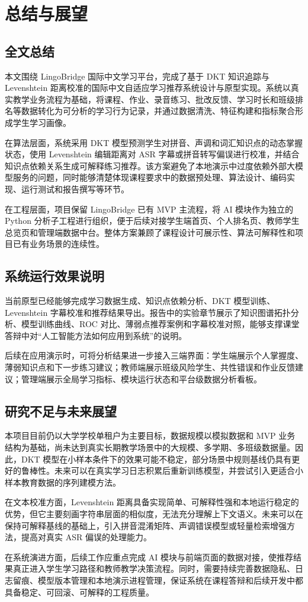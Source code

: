 
\chapter{总结与展望}

\section{全文总结}

本文围绕 LingoBridge 国际中文学习平台，完成了基于 DKT 知识追踪与 Levenshtein 距离校准的国际中文自适应学习推荐系统设计与原型实现。系统以真实教学业务流程为基础，将课程、作业、录音练习、批改反馈、学习时长和班级排名等数据转化为可分析的学习行为记录，并通过数据清洗、特征构建和指标聚合形成学生学习画像。

在算法层面，系统采用 DKT 模型预测学生对拼音、声调和词汇知识点的动态掌握状态，使用 Levenshtein 编辑距离对 ASR 字幕或拼音转写偏误进行校准，并结合知识点依赖关系生成可解释练习推荐。该方案避免了本地演示中过度依赖外部大模型服务的问题，同时能够清楚体现课程要求中的数据预处理、算法设计、编码实现、运行测试和报告撰写等环节。

在工程层面，项目保留 LingoBridge 已有 MVP 主流程，将 AI 模块作为独立的 Python 分析子工程进行组织，便于后续对接学生端首页、个人排名页、教师学生总览页和管理端数据中台。整体方案兼顾了课程设计可展示性、算法可解释性和项目已有业务场景的连续性。

\section{系统运行效果说明}

当前原型已经能够完成学习数据生成、知识点依赖分析、DKT 模型训练、Levenshtein 字幕校准和推荐结果导出。报告中的实验章节展示了知识图谱拓扑分析、模型训练曲线、ROC 对比、薄弱点推荐案例和字幕校准对照，能够支撑课堂答辩中对“人工智能方法如何应用到系统”的说明。

后续在应用演示时，可将分析结果进一步接入三端界面：学生端展示个人掌握度、薄弱知识点和下一步练习建议；教师端展示班级风险学生、共性错误和作业反馈建议；管理端展示全局学习指标、模块运行状态和平台级数据分析看板。

\section{研究不足与未来展望}

本项目目前仍以大学学校单租户为主要目标，数据规模以模拟数据和 MVP 业务结构为基础，尚未达到真实长期教学场景中的大规模、多学期、多班级数据量。因此，DKT 模型在小样本条件下的效果可能不稳定，部分场景中规则基线仍具有更好的鲁棒性。未来可以在真实学习日志积累后重新训练模型，并尝试引入更适合小样本教育数据的序列建模方法。

在文本校准方面，Levenshtein 距离具备实现简单、可解释性强和本地运行稳定的优势，但它主要刻画字符串层面的相似度，无法充分理解上下文语义。未来可以在保持可解释基线的基础上，引入拼音混淆矩阵、声调错误模型或轻量检索增强方法，提高对真实 ASR 偏误的处理能力。

在系统演进方面，后续工作应重点完成 AI 模块与前端页面的数据对接，使推荐结果真正进入学生学习路径和教师教学决策流程。同时，需要持续完善数据隐私、日志留痕、模型版本管理和本地演示进程管理，保证系统在课程答辩和后续开发中都具备稳定、可回滚、可解释的工程质量。
